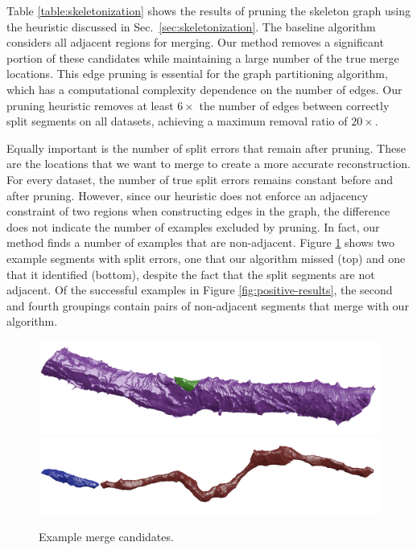 Table \ref{table:skeletonization} shows the results of pruning the skeleton graph using the heuristic discussed in Sec.~\ref{sec:skeletonization}. The baseline algorithm considers all adjacent regions for merging. Our method removes a significant portion of these candidates while maintaining a large number of the true merge locations. This edge pruning is essential for the graph partitioning algorithm, which has a computational complexity dependence on the number of edges. Our pruning heuristic removes at least $6\times$ the number of edges between correctly split segments on all datasets, achieving a maximum removal ratio of $20\times$.

Equally important is the number of split errors that remain after pruning. These are the locations that we want to merge to create a more accurate reconstruction. For every dataset, the number of true split errors remains constant before and after pruning.
However, since our heuristic does not enforce an adjacency constraint of two regions when constructing edges in the graph, the difference does not indicate the number of examples excluded by pruning. In fact, our method finds a number of examples that are non-adjacent. Figure \ref{fig:skeleton-results} shows two example segments with split errors, one that our algorithm missed (top) and one that it identified (bottom), despite the fact that the split segments are not adjacent.
Of the successful examples in Figure \ref{fig:positive-results}, the second and fourth groupings contain pairs of non-adjacent segments that merge with our algorithm.

\begin{figure}[h!]
	\centering
	\includegraphics[width=0.85\linewidth]{./figures/merge_candidate1.png}
	\includegraphics[width=0.85\linewidth]{./figures/merge_candidate2.png}
	\caption{Example merge candidates.}
	\label{fig:skeleton-results}
\end{figure}


